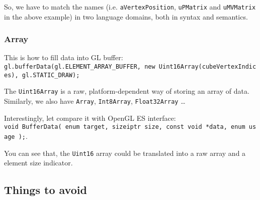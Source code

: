 So, we have to match the names (i.e. \texttt{aVertexPosition},
\texttt{uPMatrix} and \texttt{uMVMatrix} in the above example) in two
language domains, both in syntax and semantics.

\subsubsection{Array}\label{array}

This is how to fill data into GL buffer:
\texttt{gl.bufferData(gl.ELEMENT\_ARRAY\_BUFFER,\ new\ Uint16Array(cubeVertexIndices),\ gl.STATIC\_DRAW);}

The \texttt{Uint16Array} is a raw, platform-dependent way of storing an
array of data. Similarly, we also have \texttt{Array},
\texttt{Int8Array}, \texttt{Float32Array} \ldots{}

Interestingly, let compare it with OpenGL ES interface:
\texttt{void\ BufferData(\ enum\ target,\ sizeiptr\ size,\ const\ void\ *data,\ enum\ usage\ );}.

You can see that, the \texttt{Uint16} array could be translated into a
raw array and a element size indicator.

\subsection{Things to avoid}\label{things-to-avoid}

